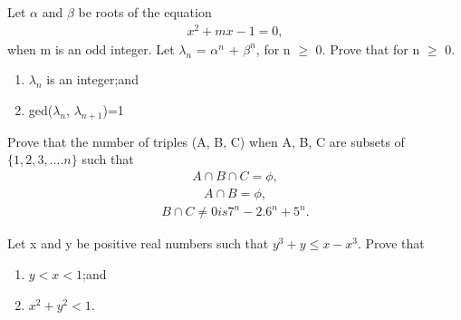 \item Let $\alpha$ and $\beta$ be roots of the equation
\begin{align} 
x^{2} + mx - 1 = 0,
\end{align}
when m is an odd integer. Let 
$\lambda_n$ = $\alpha^n$ + $\beta^n$, for n $\geq$ 0. Prove that for n $\geq$ 0.
\begin{enumerate}
\item $\lambda_n$ is an integer;and
\item ged($\lambda_n$, $\lambda_{n+1}$)=1
\end{enumerate}

\item Prove that the number of triples (A, B, C) when A, B, C are subsets of $\{1,2,3,....n\}$ such that
\begin{align*} 
A \cap B \cap C = \phi,
\end{align*}
\begin{align*}
A \cap B = \phi,
\end{align*}
\begin{align*}
B \cap C \neq  0 is 7^n - 2.6^n + 5^n.
\end{align*}

\item Let x and y be positive real numbers such that  $y^3 + y \leq x - x^3$.
Prove that 
\begin{enumerate}
\item $y < x < 1$;and
\item $x^2 + y^2 < 1$.
\end{enumerate}
